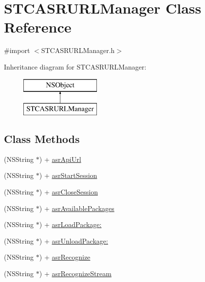 \hypertarget{interface_s_t_c_a_s_r_u_r_l_manager}{}\section{S\+T\+C\+A\+S\+R\+U\+R\+L\+Manager Class Reference}
\label{interface_s_t_c_a_s_r_u_r_l_manager}


{\ttfamily \#import $<$S\+T\+C\+A\+S\+R\+U\+R\+L\+Manager.\+h$>$}

Inheritance diagram for S\+T\+C\+A\+S\+R\+U\+R\+L\+Manager\+:\begin{figure}[H]
\begin{center}
\leavevmode
\includegraphics[height=2.000000cm]{interface_s_t_c_a_s_r_u_r_l_manager}
\end{center}
\end{figure}
\subsection*{Class Methods}
\begin{DoxyCompactItemize}
\item 
(N\+S\+String $\ast$) + \hyperlink{interface_s_t_c_a_s_r_u_r_l_manager_a2954022e950e16a4929952965fa43ec1}{asr\+Api\+Url}
\item 
(N\+S\+String $\ast$) + \hyperlink{interface_s_t_c_a_s_r_u_r_l_manager_ad7ab9c66ce37329efbf14c7ac96056d0}{asr\+Start\+Session}
\item 
(N\+S\+String $\ast$) + \hyperlink{interface_s_t_c_a_s_r_u_r_l_manager_ababc0e137a24e84452de092b2ad1b0ac}{asr\+Close\+Session}
\item 
(N\+S\+String $\ast$) + \hyperlink{interface_s_t_c_a_s_r_u_r_l_manager_a69b77a4c280941f683efeda91822010f}{asr\+Available\+Packages}
\item 
(N\+S\+String $\ast$) + \hyperlink{interface_s_t_c_a_s_r_u_r_l_manager_ad122fbe5414da177778397e6bac2f68b}{asr\+Load\+Package\+:}
\item 
(N\+S\+String $\ast$) + \hyperlink{interface_s_t_c_a_s_r_u_r_l_manager_ac17d64cd68e803e6a0dacb8f158e97ce}{asr\+Unload\+Package\+:}
\item 
(N\+S\+String $\ast$) + \hyperlink{interface_s_t_c_a_s_r_u_r_l_manager_a7a3686701a8f1274bb1d4d2a83be7551}{asr\+Recognize}
\item 
(N\+S\+String $\ast$) + \hyperlink{interface_s_t_c_a_s_r_u_r_l_manager_a749459801c620146beef96a7a0903b94}{asr\+Recognize\+Stream}
\end{DoxyCompactItemize}


